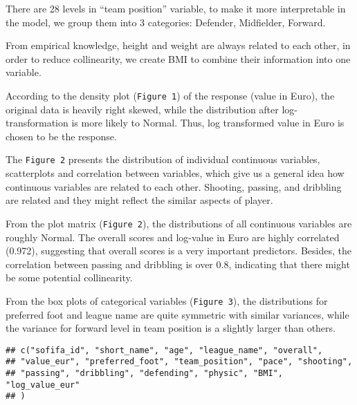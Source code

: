 \documentclass[
]{article}
\begin{document}
There are 28 levels in ``team position'' variable, to make it more
interpretable in the model, we group them into 3 categories: Defender,
Midfielder, Forward.

From empirical knowledge, height and weight are always related to each
other, in order to reduce collinearity, we create BMI to combine their
information into one variable.

According to the density plot (\texttt{Figure\ 1}) of the response
(value in Euro), the original data is heavily right skewed, while the
distribution after log-transformation is more likely to Normal. Thus,
log transformed value in Euro is chosen to be the response.

The \texttt{Figure\ 2} presents the distribution of individual
continuous variables, scatterplots and correlation between variables,
which give us a general idea how continuous variables are related to
each other. Shooting, passing, and dribbling are related and they might
reflect the similar aspects of player.

From the plot matrix (\texttt{Figure\ 2}), the distributions of all
continuous variables are roughly Normal. The overall scores and
log-value in Euro are highly correlated (0.972), suggesting that overall
scores is a very important predictors. Besides, the correlation between
passing and dribbling is over 0.8, indicating that there might be some
potential collinearity.

From the box plots of categorical variables (\texttt{Figure\ 3}), the
distributions for preferred foot and league name are quite symmetric
with similar variances, while the variance for forward level in team
position is a slightly larger than others.

\begin{verbatim}
## c("sofifa_id", "short_name", "age", "league_name", "overall", 
## "value_eur", "preferred_foot", "team_position", "pace", "shooting", 
## "passing", "dribbling", "defending", "physic", "BMI", "log_value_eur"
## )
\end{verbatim}
\end{document}

